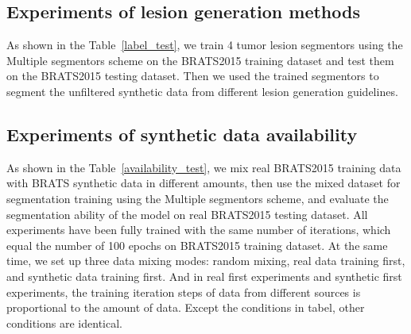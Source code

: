 \documentclass[letterpaper]{article} %
\begin{document}
\subsection{Experiments of lesion generation methods}
\label{label gen methods tests}
As shown in the Table~\ref{label_test}, we train 4 tumor lesion segmentors using the Multiple segmentors scheme on the BRATS2015 training dataset and test them on the BRATS2015 testing dataset. Then we used the trained segmentors to segment the unfiltered synthetic data from different lesion generation guidelines.

\subsection{Experiments of synthetic data availability}
As shown in the Table~\ref{availability_test}, we mix real BRATS2015 training data with BRATS synthetic data in different amounts, then use the mixed dataset for segmentation training using the Multiple segmentors scheme, and evaluate the segmentation ability of the model on real BRATS2015 testing dataset. All experiments have been fully trained with the same number of iterations, which equal the number of 100 epochs on BRATS2015 training dataset. At the same time, we set up three data mixing modes: random mixing, real data training first, and synthetic data training first. And in real first experiments and synthetic first experiments, the training iteration steps of data from different sources is proportional to the amount of data. Except the conditions in tabel, other conditions are identical.
\end{document}
